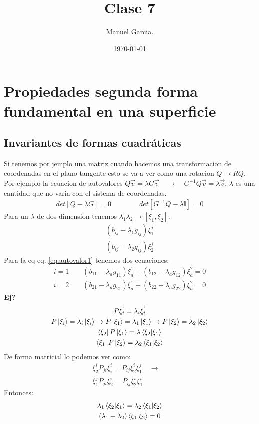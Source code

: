 \documentclass{article}
\title{Clase 7 }
\author{Manuel Garcia.}
\date{\today}
\begin{document}
\maketitle

\section{Propiedades segunda forma fundamental en una superficie}
\subsection{Invariantes de formas cuadráticas }
Si tenemos por jemplo una matriz cuando hacemos una transformacion de coordenadas en el plano tangente esto se va a ver como una rotacion $ Q \rightarrow R Q  $. Por ejemplo la ecuacion de autovalores $ Q \vec v = \lambda G \vec v  \quad \rightarrow \quad G ^ {-1 }Q \vec v = \lambda \vec v  $, $ \lambda $ es una cantidad que no varia con el sistema de coordenadas.
\begin{gather}
  det[Q - \lambda G ] = 0 \qquad \qquad det[G ^ {-1 } Q - \lambda \mathbb{I }] = 0
\end{gather}
Para un $ \lambda $ de dos dimension tenemos $ \lambda_1 \lambda_2 \rightarrow [\xi _ {1 }, \xi _ {2 }] $. 
\begin{gather}
  (b _{ij }- \lambda_1 g _{ij } ) \xi _1 ^ {j } \label{eq:autovalor1}\\
  (b _{ij } - \lambda_2 g _{ij } ) \xi _{2 } ^ {j } \label{eq:autovalor2}
\end{gather}
Para la eq eq. \ref{eq:autovalor1} tenemos dos ecuaciones: 
\begin{gather}
  i = 1 \qquad (b _{11 } - \lambda _{a  } g _{11 } )\xi _{a } ^ {1 } + (b _{12 } - \lambda_a g _{12 } )\xi _{a } ^ {2 } = 0  \\
  i = 2 \qquad (b _{21 } - \lambda _{a  } g _{21 } )\xi _{a } ^ {1 } + (b _{22 } - \lambda_a g _{22 } )\xi _{a } ^ {2 } = 0
\end{gather}
\textbf{Ej? }
\begin{gather}
  P \vec \xi_i  = \lambda_i \vec \xi_i \\
  P \ket{\xi_i } = \lambda_i \ket{\xi_i } \rightarrow P \ket{\xi_1} = \lambda_1 \ket{\xi_1 } \rightarrow P \ket{\xi_2 } = \lambda_2 \ket{\xi_2 }\\
  \bra{\xi_2 }P \ket{\xi_1 } = \lambda \bra{\xi _2 }\ket{\xi_1 }\\
  \bra{\xi_1 }P \ket{\xi _2 } = \lambda_2 \bra{\xi_1 }\ket{\xi_2 }  
\end{gather}
De forma matricial lo podemos ver como: 
\begin{gather}
  \xi_2 ^ {i }P _{ji } \xi_i ^ {i } = P _{ij } \xi _2 ^ {i } \xi _1 ^ {j }\quad \rightarrow \quad   \\
  \xi _1 ^ {j }P _{ji } \xi_2 ^ {i } = P _{ij } \xi _2 ^ {i }\xi_1 ^ {i }
\end{gather}
Entonces: 
\begin{gather}
  \lambda_1 \bra{\xi_2 }\ket{\xi_1 } = \lambda_2 \bra{\xi_1 }\ket{\xi_2 }\\
  (\lambda_1 - \lambda_2 )\bra{\xi_1 }\ket{\xi_2 } = 0 
\end{gather}
\end{document}
